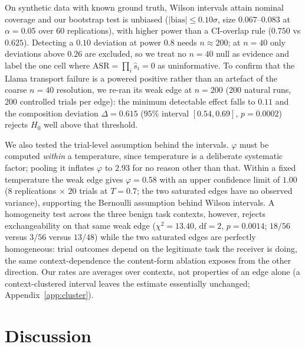 \documentclass[sigconf,anonymous]{aamas}
\begin{document}
On synthetic data with known ground truth, Wilson intervals attain nominal coverage
and our bootstrap test is unbiased ($|\mathrm{bias}| \le 0.10\sigma$, size
$0.067$--$0.083$ at $\alpha = 0.05$ over 60 replications), with higher power than a
CI-overlap rule ($0.750$ vs $0.625$). Detecting a $0.10$ deviation at power $0.8$
needs $n \approx 200$; at $n = 40$ only deviations above $0.26$ are excluded, so we
treat no $n = 40$ null as evidence and label the one cell where
$\mathrm{ASR} = \prod_i \hat s_i = 0$ as uninformative. To confirm that the Llama
transport failure is a powered positive rather than an artefact of the coarse
$n = 40$ resolution, we re-ran its weak edge at $n = 200$ (200 natural runs, 200
controlled trials per edge): the minimum detectable effect falls to $0.11$ and the
composition deviation $\Delta = 0.615$ ($95\%$ interval $[0.54, 0.69]$,
$p = 0.0002$) rejects $H_0$ well above that threshold.


We also tested the trial-level assumption behind the intervals. $\varphi$ must be
computed \emph{within} a temperature, since temperature is a deliberate systematic
factor; pooling it inflates $\varphi$ to $2.93$ for no reason other than that. Within
a fixed temperature the weak edge gives $\varphi = 0.58$ with an upper confidence
limit of $1.00$ ($8$ replications $\times$ $20$ trials at $T = 0.7$; the two
saturated edges have no observed variance), supporting the Bernoulli assumption
behind Wilson intervals. A homogeneity test across the three benign task
contexts, however, rejects exchangeability on that same weak edge
($\chi^2 = 13.40$, $\mathrm{df} = 2$, $p = 0.0014$; $18/56$ versus $3/56$ versus
$13/48$) while the two saturated edges are perfectly homogeneous: trial outcomes
depend on the legitimate task the receiver is doing, the same context-dependence the
content-form ablation exposes from the other direction. Our rates are averages over
contexts, not properties of an edge alone (a context-clustered interval leaves the
estimate essentially unchanged; Appendix~\ref{app:cluster}).


\section{Discussion}
\label{sec:discussion}
\end{document}
